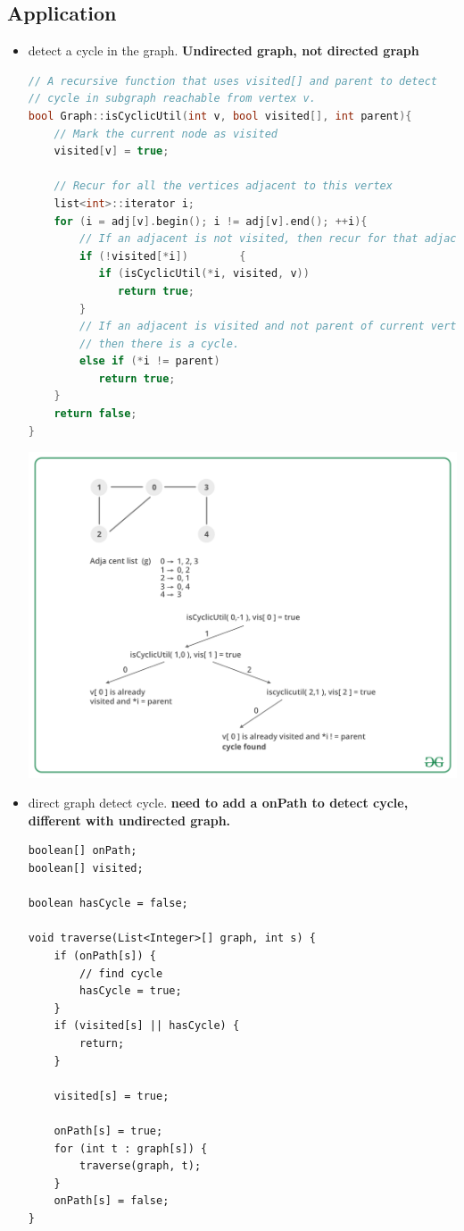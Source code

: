 \documentclass[a4paper,11pt,twoside]{book}
\begin{document}
\subsection{Application}
\begin{itemize}
\item detect a cycle in the graph. \textbf{Undirected graph, not directed graph}
\begin{lstlisting}[frame=single, language=c++]
// A recursive function that uses visited[] and parent to detect
// cycle in subgraph reachable from vertex v.
bool Graph::isCyclicUtil(int v, bool visited[], int parent){
    // Mark the current node as visited
    visited[v] = true;
 
    // Recur for all the vertices adjacent to this vertex
    list<int>::iterator i;
    for (i = adj[v].begin(); i != adj[v].end(); ++i){
        // If an adjacent is not visited, then recur for that adjacent
        if (!visited[*i])        {
           if (isCyclicUtil(*i, visited, v))
              return true;
        }
        // If an adjacent is visited and not parent of current vertex,
        // then there is a cycle.
        else if (*i != parent)
           return true;
    }
    return false;
}
\end{lstlisting}

\begin{center}
		\includegraphics[width=0.7\linewidth]{pics/dc.png}
\end{center}

	\item direct graph detect cycle. \textbf{need to add a onPath to detect cycle, different with undirected graph.}
\begin{lstlisting}
boolean[] onPath;
boolean[] visited;

boolean hasCycle = false;

void traverse(List<Integer>[] graph, int s) {
	if (onPath[s]) {
		// find cycle
		hasCycle = true;
	}
	if (visited[s] || hasCycle) {
		return;
	}

	visited[s] = true;

	onPath[s] = true;
	for (int t : graph[s]) {
		traverse(graph, t);
	}
	onPath[s] = false;
}
\end{lstlisting}

\end{itemize}
\end{document}
